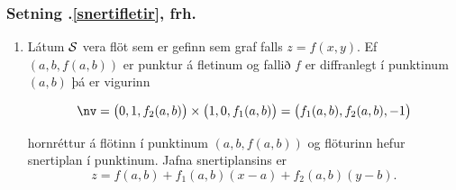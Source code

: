  \subsubsection{Setning \kaflanr.\ref{snertifletir}, frh.}
   \begin {enumerate}
    \item [2.] 
   Látum $\cal S$ vera flöt sem er gefinn sem graf falls 
     $z=f(x,y)$.   Ef $(a, b, f(a,b))$ er punktur á fletinum og
     fallið $f$ er diffranlegt í punktinum $(a, b)$ þá er vigurinn
     
     $$\nv =\big(0 ,1 ,f_2(a, b)\big)\times\big(1 ,0 ,f_1(a, b)\big)
=\big(f_1(a, b), f_2(a, b), -1\big)$$ 

hornréttur á flötinn í punktinum $(a,
     b, f(a,b))$ og flöturinn hefur snertiplan í punktinum.  Jafna
     snertiplansins er
$$z=f(a, b)+f_1(a, b)(x-a)+f_2(a, b)(y-b).$$
   \end {enumerate}

 



